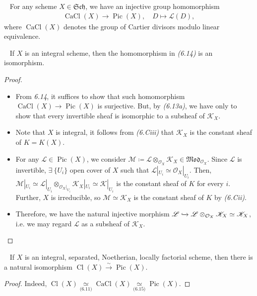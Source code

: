 \documentclass[11pt,a4paper,footinclude=true,headinclude=true]{scrbook} %
\DeclareMathOperator{\Pic}{Pic}
\DeclareMathOperator{\Cl}{Cl}
\DeclareMathOperator{\CaCl}{CaCl}
\newcommand{\KK}{\mathscr{K}}
\newcommand{\LL}{\mathscr{L}}
\newcommand{\MM}{\mathscr{M}}
\newcommand{\OO}{\mathcal{O}}
\newcommand{\Sch}{\mathfrak{Sch}}
\newcommand{\<}{\langle}
\newcommand{\>}{\rangle}
\newcommand{\isoto}{\overset{\sim}{\to}}
\newcommand{\MOD}{\mathfrak{Mod}}
\newenvironment{proposition}[2][]
{\renewcommand\theinnercustomprop{#2}\innercustomprop[#1] 
\begin{mdframed}[backgroundcolor=gray!20]\ }
{\end{mdframed}\endinnercustomprop}
\newenvironment{corollary}[2][]
{\renewcommand\theinnercustomcol{#2}\innercustomcol[#1]
\begin{mdframed}[backgroundcolor=gray!20]\ }
{\end{mdframed}\endinnercustomcol}
\begin{document}
\begin{corollary}{6.14}
    For any scheme $X\in\Sch$, we have an injective group homomorphism
    \begin{align*}
        \CaCl(X)\longrightarrow\Pic(X),\quad D\longmapsto\LL(D),
    \end{align*}
    where $\CaCl(X)$ denotes the group of Cartier divisors modulo linear equivalence.
\end{corollary}

\begin{proposition}{6.15}
    If $X$ is an integral scheme, then the homomorphism in \textit{(6.14)} is an isomorphism.
\end{proposition}
\begin{proof}\mbox{}
    \begin{itemize}
        \item From \textit{6.14}, it suffices to show that such homomorphism $\CaCl(X)\to\Pic(X)$ is surjective. But, by \textit{(6.13a)}, we have only to show that every invertible sheaf is isomorphic to a subsheaf of $\KK_X$.
        \item Note that $X$ is integral, it follows from \textit{(6.Ciii)} that $\KK_X$ is the constant sheaf of $K=K(X)$.
        \item For any $\LL\in\Pic(X)$, we consider $\MM\coloneqq\LL\otimes_{\OO_X}\KK_X\in\MOD_{\OO_X}$. Since $\LL$ is invertible, $\exists\ \{U_i\}$ open cover of $X$ such that $\LL|_{U_i}\simeq\OO_X|_{U_i}$. Then, $\MM|_{U_i}\simeq\LL|_{U_i}\otimes_{\OO_X|_{U_i}}\KK_X|_{U_i}\simeq\KK|_{U_i}$ is the constant sheaf of $K$ for every $i$. Further, $X$ is irreducible, so $\MM\simeq\KK_X$ is the constant sheaf of $K$ by \textit{(6.Cii)}.
        \item Therefore, we have the natural injective morphism $\LL\xhookrightarrow{}\LL\otimes_{\OO_X}\KK_X\simeq\KK_X$, i.e. we may regard $\LL$ as a subsheaf of $\KK_X$.
    \end{itemize}
\end{proof}

\begin{corollary}{6.16}
    If $X$ is an integral, separated, Noetherian, locally factorial scheme, then there is a natural isomorphism $\Cl(X)\isoto\Pic(X)$.
\end{corollary}
\begin{proof}
    Indeed, $\Cl(X)\underset{\text{(6.11)}}{\simeq}\CaCl(X)\underset{\text{(6.15)}}{\simeq}\Pic(X)$.
\end{proof}
\end{document}
